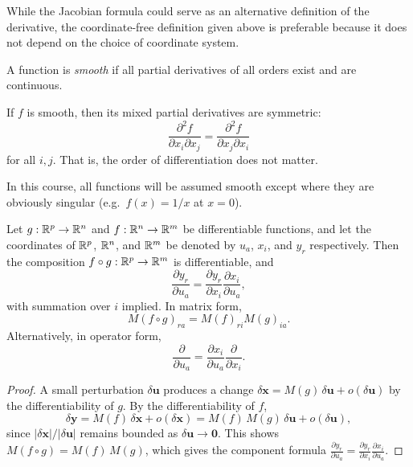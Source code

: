 \documentclass[a4paper]{article}
\begin{document}
\begin{rmk}
  While the Jacobian formula could serve as an alternative definition of the derivative, the coordinate-free definition given above is preferable because it does not depend on the choice of coordinate system.
\end{rmk}

\begin{defi}
  A function is \emph{smooth} if all partial derivatives of all orders exist and are continuous.
\end{defi}

\begin{prop}
  If $f$ is smooth, then its mixed partial derivatives are symmetric:
  \[
    \frac{\partial^2 f}{\partial x_i \partial x_j} = \frac{\partial^2 f}{\partial x_j \partial x_i}
  \]
  for all $i, j$. That is, the order of differentiation does not matter.
\end{prop}

\begin{rmk}
  In this course, all functions will be assumed smooth except where they are obviously singular (e.g.\ $f(x) = 1/x$ at $x = 0$).
\end{rmk}

\begin{thm}
  Let $g: \mathbb{R}^p\to\mathbb{R}^n$ and $f: \mathbb{R}^n \to \mathbb{R}^m$ be differentiable functions, and let the coordinates of $\mathbb{R}^p$, $\mathbb{R}^n$, and $\mathbb{R}^m$ be denoted by $u_a$, $x_i$, and $y_r$ respectively. Then the composition $f \circ g: \mathbb{R}^p \to \mathbb{R}^m$ is differentiable, and
  \[
    \frac{\partial y_r}{\partial u_a} = \frac{\partial y_r}{\partial x_i}\frac{\partial x_i}{\partial u_a},
  \]
  with summation over $i$ implied. In matrix form,
  \[
    M(f\circ g)_{ra} = M(f)_{ri}M(g)_{ia}.
  \]
  Alternatively, in operator form,
  \[
    \frac{\partial}{\partial u_a} = \frac{\partial x_i}{\partial u_a}\frac{\partial}{\partial x_i}.
  \]
\end{thm}

\begin{proof}
  A small perturbation $\delta \mathbf{u}$ produces a change $\delta \mathbf{x} = M(g)\,\delta\mathbf{u} + o(\delta\mathbf{u})$ by the differentiability of $g$. By the differentiability of $f$,
  \[
    \delta \mathbf{y} = M(f)\,\delta\mathbf{x} + o(\delta\mathbf{x}) = M(f)\,M(g)\,\delta\mathbf{u} + o(\delta\mathbf{u}),
  \]
  since $|\delta\mathbf{x}|/|\delta\mathbf{u}|$ remains bounded as $\delta\mathbf{u} \to \mathbf{0}$. This shows $M(f \circ g) = M(f)\,M(g)$, which gives the component formula $\frac{\partial y_r}{\partial u_a} = \frac{\partial y_r}{\partial x_i}\frac{\partial x_i}{\partial u_a}$.
\end{proof}
\end{document}
